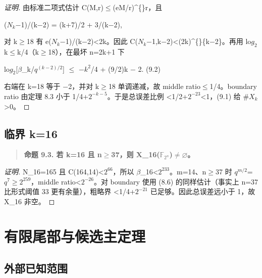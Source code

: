 \documentclass[11pt]{ctexart}
\begin{document}
\begin{proof}[证明] 

由标准二项式估计 C(M,r)\ensuremath{\le}(eM/r)\textasciicircum\{\}r，且

(\ensuremath{N_{k}}−1)/(k−2) = (k+7)/2 + 3/(k−2),

对 k\ensuremath{\ge}18 有 e(\ensuremath{N_{k}}−1)/(k−2)<2k。因此 C(\ensuremath{N_{k}}−1,k−2)<(2k)\textasciicircum\{\}\{k−2\}。再用 lo\ensuremath{g_2}k\ensuremath{\le}k/4（k\ensuremath{\ge}18），在最坏 n=2k+1 下

lo\ensuremath{g_2}[\ensuremath{\beta}\_k/\ensuremath{q^{(k−2)/2}}] \ensuremath{\le} −\ensuremath{k^2}/4 + (9/2)k − 2.    (9.2)

右端在 k=18 等于 −2，并对 k\ensuremath{\ge}18 单调递减，故 middle ratio\ensuremath{\le}1/4。boundary ratio 由定理 8.3 小于 1/4+\ensuremath{2^{-k−5}}。于是总误差比例 <1/2+\ensuremath{2^{-23}}<1，(9.1) 给 \#\ensuremath{X_{k}}>0。

\end{proof}

\subsection{临界 k=16}

\begin{quote}\textbf{命题 9.3. 若 k=16 且 n\ensuremath{\ge}37，则 X\_16(\ensuremath{\mathbb F_{2^n}})\ensuremath{\ne}\ensuremath{\varnothing}。}\end{quote}

\begin{proof}[证明] 

N\_16=165 且 C(164,14)<\ensuremath{2^{66}}，所以 \ensuremath{\beta}\_16<\ensuremath{2^{233}}。m=14、n\ensuremath{\ge}37 时 \ensuremath{q^{m/2}}=\ensuremath{q^{7}}\ensuremath{\ge}\ensuremath{2^{259}}，middle ratio<\ensuremath{2^{-26}}。对 boundary 使用 (8.6) 的同样估计（事实上 n=37 比形式阈值 33 更有余量），粗略界 <1/4+\ensuremath{2^{-21}} 已足够。因此总误差远小于 1，故 X\_16 非空。

\end{proof}

\section{有限尾部与候选主定理}

\subsection{外部已知范围}
\end{document}
